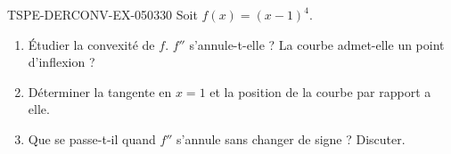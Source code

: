 \begin{exercice}{TSPE-DERCONV-EX-050}{3}{30}
Soit $f(x) = (x-1)^4$.
\begin{enumerate}
  \item Étudier la convexité de $f$. $f''$ s'annule-t-elle ? La courbe admet-elle un point d'inflexion ?
  \item Déterminer la tangente en $x = 1$ et la position de la courbe par rapport a elle.
  \item Que se passe-t-il quand $f''$ s'annule sans changer de signe ? Discuter.
\end{enumerate}

\end{exercice}
